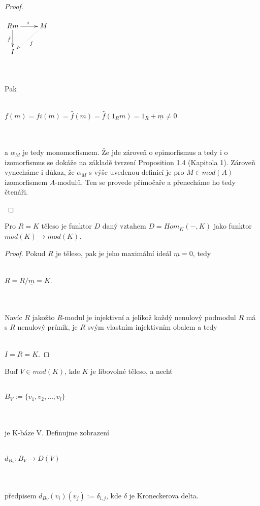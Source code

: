 \begin{proof}
\begin{description}
         \centerline{$\xymatrix{
           Rm \ar[r]^i  \ar[d]_{\hat f} & M \ar@{.>}[ld]^f \\
           I
         }$}\\\\
         Pak \\\\
         \centerline{$f(m)=fi(m)=\hat f(m)=\hat f(1_Rm)=1_R+ \underline m\neq 0$} 
         \\\\
         a $\alpha_M$ je tedy monomorfismem. Že jde zároveň o epimorfismus a tedy i o izomorfismus se 
         dokáže na základě tvrzení \cite{2} Proposition 1.4 (Kapitola 1). 
         Zároveň vynecháme i důkaz, že $\alpha_M$ s výše uvedenou definicí 
         je pro $M\in mod(A)$ izomorfismem $A$-modulů. 
         Ten se provede přímočaře a přenecháme ho tedy čtenáři.
       \end{description}
     \end{proof}
     
     \begin{dsl}\label{lem-dual-teleso}
       Pro $R=K$ těleso je funktor $D$ daný vztahem $D=Hom_K(-,K)$
       jako funktor $mod(K)\rightarrow mod(K)$.
     \end{dsl}
     \begin{proof}
       Pokud $R$ je těleso, pak  je jeho maximální ideál $\underline{m}=0$, tedy 
       \\\\
       \centerline{$R=R/\underline{m}=K$.}\\\\
       Navíc $R$ jakožto $R$-modul je injektivní a jelikož každý nenulový 
       podmodul $R$ má s $R$ nenulový průnik, je $R$ svým vlastním injektivním 
       obalem a tedy \\\\
       \centerline{$I=R=K$.}
     \end{proof}
     
     \begin{dfn}
       Buď $V\in mod(K)$, kde $K$ je libovolné těleso, a nechť \\\\
       \centerline{$B_V:=\{v_1,v_2,\ldots,v_l\}$}\\\\
       je K-báze V. Definujme zobrazení \\\\
       \centerline{$d_{B_V}:B_V\rightarrow D(V)$} \\\\
       předpisem $d_{B_V}(v_i)(v_j):=\delta_{i,j}$, kde $\delta$ je Kroneckerova 
       delta.
     \end{dfn}
     
